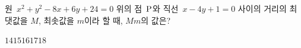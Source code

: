 원~$x^2+y^2-8x+6y+24=0$ 위의 점~$\mathrm{P}$와 직선~$x-4y+1=0$ 사이의 거리의 최댓값을 $M$, 최솟값을 $m$이라 할 때, $Mm$의 값은?
\begin{choices32}{$14$}{$15$}{$16$}{$17$}{$18$}\end{choices32}
